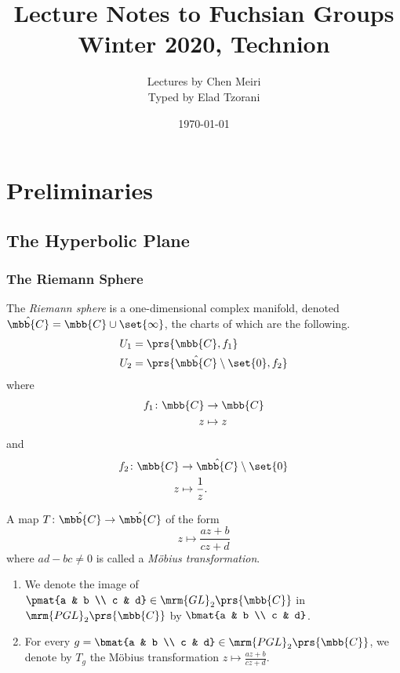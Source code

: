 \documentclass[10pt, twoside]{book}
\title{Lecture Notes to Fuchsian Groups \\ \large{Winter 2020, Technion}}
\author{Lectures by Chen Meiri \\ \small{Typed by Elad Tzorani}}
\date{\today}
\begin{document}
\maketitle
\tableofcontents

\chapter{Preliminaries}

\section{The Hyperbolic Plane}

\subsection{The Riemann Sphere}

\begin{definition}
The \emph{Riemann sphere} is a one-dimensional complex manifold, denoted $\hat{\mbb{C}} = \mbb{C} \cup \set{\infty}$, the charts of which are the following.
\begin{align*}
U_1 &= \prs{\mbb{C}, f_1} \\
U_2 &= \prs{\hat{\mbb{C}} \setminus \set{0}, f_2}
\end{align*}
where
\begin{align*}
f_1 \colon \mbb{C} &\to \mbb{C} \\
z &\mapsto z
\end{align*}
and
\begin{align*}
f_2 \colon \mbb{C} &\to \hat{\mbb{C}} \setminus \set{0} \\
z &\mapsto \frac{1}{z} \text{.}
\end{align*}
\end{definition}

\begin{definition}
A map $T \colon \hat{\mbb{C}} \to \hat{\mbb{C}}$ of the form
\[z \mapsto \frac{az + b}{cz + d}\]
where $ad - bc \neq 0$ is called a \emph{Möbius transformation}.
\end{definition}

\begin{notation}
\begin{enumerate}
\item We denote the image of $\pmat{a & b \\ c & d} \in \mrm{GL}_2\prs{\mbb{C}}$ in $\mrm{PGL}_2\prs{\mbb{C}}$ by $\bmat{a & b \\ c & d}$.
\item For every $g = \bmat{a & b \\ c & d} \in \mrm{PGL}_2\prs{\mbb{C}}$, we denote by $T_g$ the Möbius transformation $z \mapsto \frac{az + b}{cz + d}$.
\end{enumerate}
\end{notation}
\end{document}
